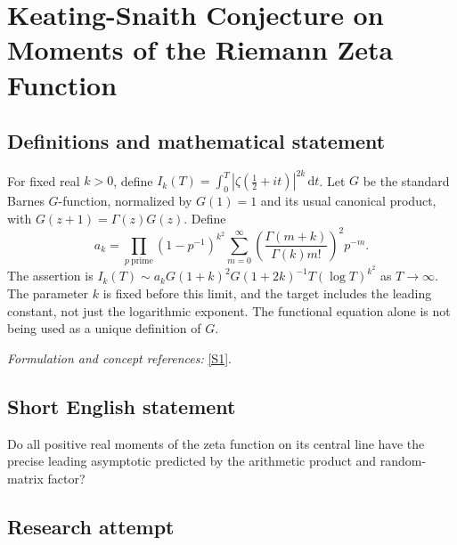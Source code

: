 \documentclass[11pt,a4paper]{article}
\newcommand{\dd}{\,\mathrm d}
\newcommand{\sref}[2]{\hyperlink{source:#1:#2}{[S#2]}}
\newif\ifshowcatalogue
\newcommand{\cataloguescope}[1]{\ifshowcatalogue
 \paragraph{Exact scope in the supplied catalogue.}
 \begin{quote}\small #1\end{quote}\fi}
\numberwithin{equation}{section}
\begin{document}
\setcounter{section}{0}
\clearpage
\section*{\texorpdfstring{Keating-Snaith Conjecture on Moments of the Riemann Zeta Function}{Keating-Snaith Conjecture on Moments of the Riemann Zeta Function}}\label{30006978}
\subsection{Definitions and mathematical statement}
For fixed real $k>0$, define $I_k(T)=\int_0^T|\zeta(\tfrac12+it)|^{2k}\dd t$. Let $G$ be the standard Barnes $G$-function, normalized by $G(1)=1$ and its usual canonical product, with $G(z+1)=\Gamma(z)G(z)$. Define
\[
 a_k=\prod_{p\ \mathrm{prime}}(1-p^{-1})^{k^2}
 \sum_{m=0}^{\infty}\left(\frac{\Gamma(m+k)}{\Gamma(k)m!}\right)^2p^{-m}.
\]
The assertion is
$I_k(T)\sim a_kG(1+k)^2G(1+2k)^{-1}T(\log T)^{k^2}$ as $T\to\infty$. The parameter $k$ is fixed before this limit, and the target includes the leading constant, not just the logarithmic exponent. The functional equation alone is not being used as a unique definition of $G$.
\par\smallskip\textit{Formulation and concept references:} \sref{30006978}{1}.
\cataloguescope{For every fixed real k>0, let I\_k(T)=integral\_0\textasciicircum{}T |zeta(1/2+it)|\textasciicircum{}(2k) dt. Prove that I\_k(T) is asymptotic to a\_k G(1+k)\textasciicircum{}2/G(1+2k) times T(log T)\textasciicircum{}(k\textasciicircum{}2), where G is the Barnes G-function and a\_k=product\_p (1-1/p)\textasciicircum{}(k\textasciicircum{}2) sum\_(m>=0) (Gamma(m+k)/(Gamma(k)m!))\textasciicircum{}2 p\textasciicircum{}(-m).}
\subsection{Short English statement}
Do all positive real moments of the zeta function on its central line have the precise leading asymptotic predicted by the arithmetic product and random-matrix factor?
\subsection{Research attempt}
\end{document}
